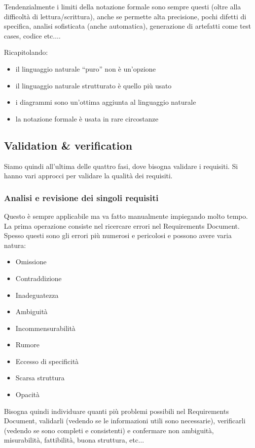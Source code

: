 Tendenzialmente i limiti della notazione formale sono sempre questi (oltre alla difficoltà di lettura/scrittura), anche se permette alta precisione, pochi difetti di specifica, analisi sofisticata (anche automatica), generazione di artefatti come test cases, codice etc$\dots$.

Ricapitolando:
\begin{itemize}
\item il linguaggio naturale “puro” non è un’opzione
\item il linguaggio naturale strutturato è quello più usato
\item i diagrammi sono un'ottima aggiunta al linguaggio naturale
\item la notazione formale è usata in rare circostanze
\end{itemize}
\subsection{Validation \& verification}
Siamo quindi all'ultima delle quattro fasi, dove bisogna validare i requisiti. Si hanno vari approcci per validare la qualità dei requisiti.
\subsubsection{Analisi e revisione dei singoli requisiti}
Questo è sempre applicabile ma va fatto manualmente impiegando molto tempo. La prima operazione consiste nel ricercare errori nel Requirements Document. Spesso questi sono gli errori più numerosi e pericolosi e possono avere varia natura:
\begin{itemize}
    \item Omissione
    \item Contraddizione
    \item Inadeguatezza
    \item Ambiguità
    \item Incommensurabilità
    \item Rumore
    \item Eccesso di specificità
    \item Scarsa struttura
    \item Opacità
\end{itemize}
Bisogna quindi individuare quanti più problemi possibili nel Requirements Document, validarli (vedendo se le informazioni utili sono necessarie), verificarli (vedendo se sono completi e consistenti) e confermare non ambiguità, misurabilità, fattibilità, buona struttura, etc$\dots$ 

